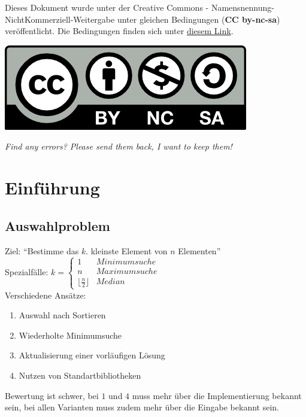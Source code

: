 \documentclass{scrartcl}
\begin{document}

\begin{shaded}
Dieses Dokument wurde unter der Creative Commons - Namensnennung-NichtKommerziell-Weitergabe unter gleichen Bedingungen (\textbf{CC by-nc-sa}) veröffentlicht. Die Bedingungen finden sich unter \href{http://creativecommons.org/licenses/by-nc-sa/3.0/de}{diesem Link}. \\
\centerline{\includegraphics[scale=1]{../cc-by-nc-sa.png} }
\end{shaded}

\textit{Find any errors? Please send them back, I want to keep them!}

\section{Einführung}
\subsection{Auswahlproblem}
Ziel: "`Bestimme das $k$. kleinste Element von $n$ Elementen"' \\
Spezialfälle: $k=
\begin{cases}
1 & Minimumsuche \\
n & Maximumsuche \\
\lfloor \frac{n}{2} \rfloor & Median
\end{cases}$\\

Verschiedene Ansätze:
\begin{enumerate}
	\item Auswahl nach Sortieren
	\item Wiederholte Minimumsuche
	\item Aktualisierung einer vorläufigen Lösung
	\item Nutzen von Standartbibliotheken
\end{enumerate}
Bewertung ist schwer, bei $1$ und $4$ muss mehr über die Implementierung bekannt sein, bei allen Varianten muss zudem mehr über die Eingabe bekannt sein.
\end{document}
